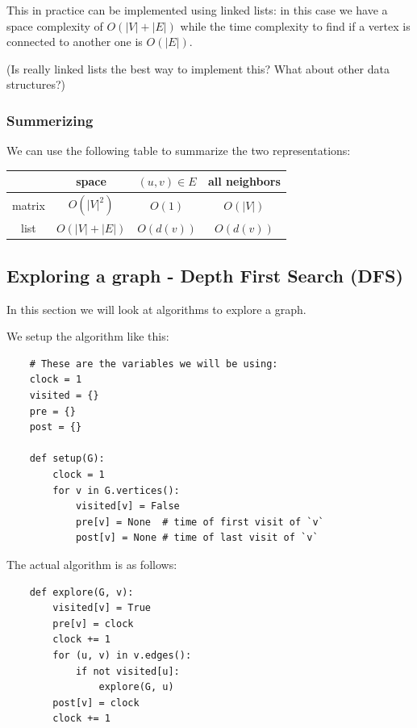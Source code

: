 \documentclass[10pt]{extarticle}
\begin{document}
This in practice can be implemented using linked lists: in this case we have a space complexity of $O(|V| + |E|)$ while the time complexity to find if a vertex is connected to another one is $O(|E|)$.

(Is really linked lists the best way to implement this? What about other data structures?)

\subsubsection{Summerizing}

We can use the following table to summarize the two representations:

\begin{center}
    \begin{tabular}{c|c|c|c}
               & space          & $(u, v) \in E$ & all neighbors \\
        \hline
        matrix & $O(|V|^2)$     & $O(1)$         & $O(|V|)$      \\
        list   & $O(|V| + |E|)$ & $O(d(v))$      & $O(d(v))$
    \end{tabular}
    \label{tab:graphrepr}
\end{center}

\subsection{Exploring a graph - Depth First Search (DFS)}

In this section we will look at algorithms to explore a graph.

We setup the algorithm like this:

\begin{verbatim}
    # These are the variables we will be using:
    clock = 1
    visited = {}
    pre = {}
    post = {}

    def setup(G):
        clock = 1
        for v in G.vertices():
            visited[v] = False
            pre[v] = None  # time of first visit of `v`
            post[v] = None # time of last visit of `v`
\end{verbatim}

The actual algorithm is as follows:

\begin{verbatim}
    def explore(G, v):
        visited[v] = True
        pre[v] = clock
        clock += 1
        for (u, v) in v.edges():
            if not visited[u]:
                explore(G, u)
        post[v] = clock
        clock += 1
\end{verbatim}
\end{document}

